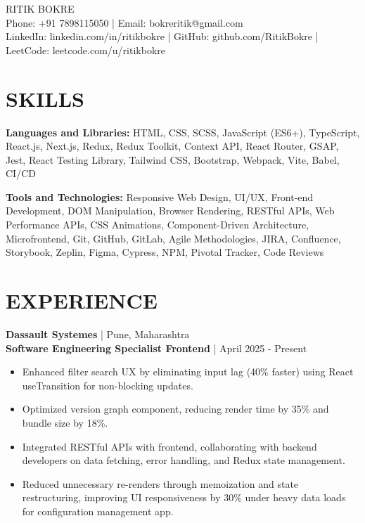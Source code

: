 \documentclass[letterpaper,10.5pt]{article}
\begin{document}
\begin{center}
    {\Large RITIK BOKRE}\\
    \vspace{1pt}
    Phone: +91 7898115050 | Email: bokreritik@gmail.com\\
    LinkedIn: linkedin.com/in/ritikbokre | GitHub: github.com/RitikBokre | LeetCode: leetcode.com/u/ritikbokre
\end{center}
\vspace{-10pt}

\section*{SKILLS}
\textbf{Languages and Libraries:} HTML, CSS, SCSS, JavaScript (ES6+), TypeScript, React.js, Next.js, Redux, Redux Toolkit, Context API, React Router, GSAP, Jest, React Testing Library, Tailwind CSS, Bootstrap, Webpack, Vite, Babel, CI/CD

\textbf{Tools and Technologies:} Responsive Web Design, UI/UX, Front-end Development, DOM Manipulation, Browser Rendering, RESTful APIs, Web Performance APIs, CSS Animations, Component-Driven Architecture, Microfrontend, Git, GitHub, GitLab, Agile Methodologies, JIRA, Confluence, Storybook, Zeplin, Figma, Cypress, NPM, Pivotal Tracker, Code Reviews

\vspace{-4pt}

\section*{EXPERIENCE}

\textbf{Dassault Systemes} | Pune, Maharashtra\\
\textbf{Software Engineering Specialist Frontend} | April 2025 - Present

\begin{itemize}[leftmargin=0.15in, itemsep=-1pt]
    \item Enhanced filter search UX by eliminating input lag (40\% faster) using React useTransition for non-blocking updates.
    \item Optimized version graph component, reducing render time by 35\% and bundle size by 18\%.
    \item Integrated RESTful APIs with frontend, collaborating with backend developers on data fetching, error handling, and Redux state management.
    \item Reduced unnecessary re-renders through memoization and state restructuring, improving UI responsiveness by 30\% under heavy data loads for configuration management app.
\end{itemize}
\end{document}
